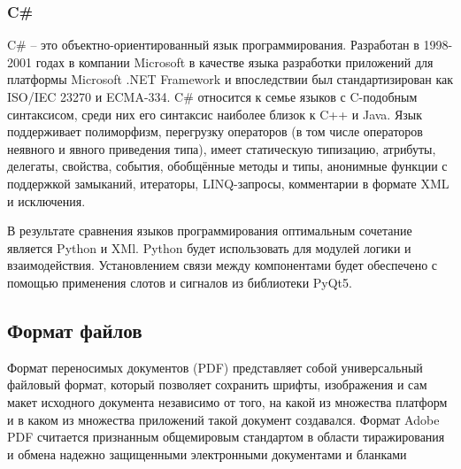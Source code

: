 \subsubsection{C\#}
C\# – это объектно-ориентированный язык программирования. Разработан в 1998-2001 годах в компании Microsoft в качестве языка разработки приложений для платформы Microsoft .NET Framework и впоследствии был стандартизирован как ISO/IEC 23270 и ECMA-334. C\# относится к семье языков с C-подобным синтаксисом, среди них его синтаксис наиболее близок к C++ и Java. 
Язык поддерживает полиморфизм, перегрузку операторов (в том числе операторов неявного и явного приведения типа), имеет статическую типизацию, атрибуты, делегаты, свойства, события, обобщённые методы и типы, анонимные функции с поддержкой замыканий, итераторы, LINQ-запросы,
комментарии в формате XML и исключения.

В результате сравнения языков программирования оптимальным сочетание является Python и XMl.
Python будет использовать для модулей логики и взаимодействия.
Установлением связи между компонентами будет обеспечено с помощью применения слотов и сигналов из библиотеки PyQt5.

\subsection{Формат файлов}
Формат переносимых документов (PDF) представляет собой универсальный файловый формат, который позволяет сохранить шрифты, изображения и сам макет исходного документа независимо от того, на какой из множества платформ и в каком из множества приложений такой документ создавался. 
Формат Adobe PDF считается признанным общемировым стандартом в области тиражирования и обмена надежно защищенными электронными документами и бланками \cite{23}


